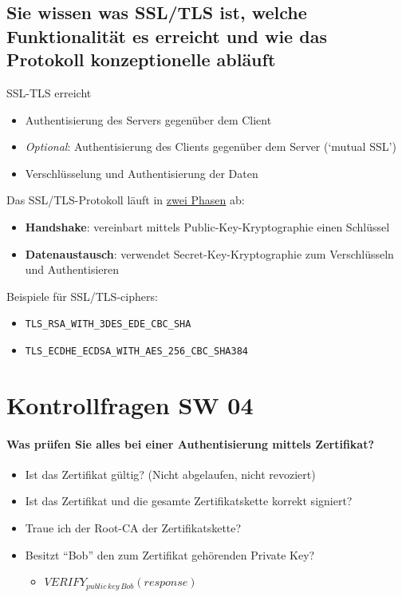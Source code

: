 \documentclass[10pt,a4paper]{article}
\begin{document}
\subsection*{Sie wissen was SSL/TLS ist, welche Funktionalität es erreicht und wie das Protokoll konzeptionelle abläuft}SSL-TLS erreicht
\begin{itemize}[noitemsep,topsep=0pt,leftmargin=*]
    \item Authentisierung des Servers gegenüber dem Client
    \item \textsl{Optional}: Authentisierung des Clients gegenüber dem Server (`mutual SSL')
    \item Verschlüsselung und Authentisierung der Daten
\end{itemize}
Das SSL/TLS-Protokoll läuft in \underline{zwei Phasen} ab:
\begin{itemize}[noitemsep,topsep=0pt,leftmargin=*]
    \item \textbf{Handshake}: vereinbart mittels Public-Key-Kryptographie einen Schlüssel
    \item \textbf{Datenaustausch}: verwendet Secret-Key-Kryptographie zum Verschlüsseln und Authentisieren
\end{itemize}
Beispiele für SSL/TLS-ciphers:
\begin{itemize}[noitemsep,topsep=0pt,leftmargin=*]
    \item \verb|TLS_RSA_WITH_3DES_EDE_CBC_SHA|
    \item \verb|TLS_ECDHE_ECDSA_WITH_AES_256_CBC_SHA384|
\end{itemize}

\section*{Kontrollfragen SW 04}
\paragraph*{Was prüfen Sie alles bei einer Authentisierung mittels Zertifikat?}
\begin{itemize}[noitemsep,topsep=0pt,leftmargin=*]
    \item Ist das Zertifikat gültig? (Nicht abgelaufen, nicht revoziert)
    \item Ist das Zertifikat und die gesamte Zertifikatskette korrekt signiert?
    \item Traue ich der Root-CA der Zertifikatskette?
    \item Besitzt "`Bob"' den zum Zertifikat gehörenden Private Key?
    \begin{itemize}[noitemsep,topsep=0pt,leftmargin=*]
        \item $VERIFY_{public\,key\,Bob}(response)$
    \end{itemize}
\end{itemize}
\end{document}
